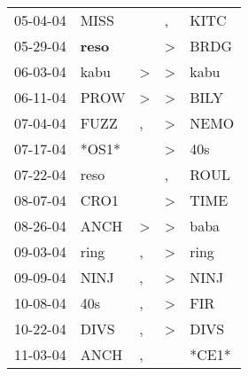 \begin{supertabular}{p{0.07\textwidth}p{0.06\textwidth}p{0.02\textwidth}p{0.02\textwidth}p{0.06\textwidth}}
          05-04-04\textsuperscript{} &           MISS\textsuperscript{} &                  &                , &           KITC\textsuperscript{} \\
          05-29-04\textsuperscript{} &  \textbf{reso\textsuperscript{}} &                  &     \textgreater &           BRDG\textsuperscript{} \\
          06-03-04\textsuperscript{} &           kabu\textsuperscript{} &     \textgreater &     \textgreater &           kabu\textsuperscript{} \\
          06-11-04\textsuperscript{} &           PROW\textsuperscript{} &     \textgreater &     \textgreater &           BILY\textsuperscript{} \\
          07-04-04\textsuperscript{} &           FUZZ\textsuperscript{} &                , &     \textgreater &           NEMO\textsuperscript{} \\
          07-17-04\textsuperscript{} &                            *OS1* &                  &     \textgreater &            40s\textsuperscript{} \\
          07-22-04\textsuperscript{} &           reso\textsuperscript{} &                  &                , &           ROUL\textsuperscript{} \\
          08-07-04\textsuperscript{} &           CRO1\textsuperscript{} &                  &     \textgreater &           TIME\textsuperscript{} \\
          08-26-04\textsuperscript{} &           ANCH\textsuperscript{} &     \textgreater &     \textgreater &           baba\textsuperscript{} \\
          09-03-04\textsuperscript{} &           ring\textsuperscript{} &                , &     \textgreater &           ring\textsuperscript{} \\
          09-09-04\textsuperscript{} &           NINJ\textsuperscript{} &                , &     \textgreater &           NINJ\textsuperscript{} \\
          10-08-04\textsuperscript{} &            40s\textsuperscript{} &                , &     \textgreater &            FIR\textsuperscript{} \\
          10-22-04\textsuperscript{} &           DIVS\textsuperscript{} &                , &     \textgreater &           DIVS\textsuperscript{} \\
          11-03-04\textsuperscript{} &           ANCH\textsuperscript{} &                , &                  &                            *CE1* \\

\end{supertabular}
